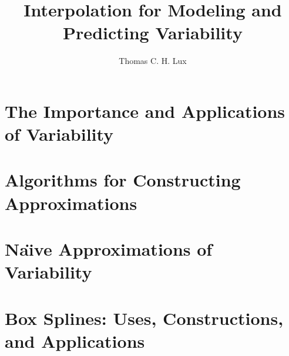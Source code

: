 \documentclass[doublespace,nopageskip]{VTthesis} %
\title{Interpolation for Modeling and Predicting Variability}
\author{Thomas C. H. Lux}
\begin{document}
\frontmatter
\maketitle
\tableofcontents

\listoffigures
\listoftables


\mainmatter


\chapter{The Importance and Applications of Variability} \label{ch:apps}


\chapter{Algorithms for Constructing Approximations} \label{ch:algs}


\chapter{Na\"{\i}ve Approximations of Variability} \label{ch:naive}


\chapter{Box Splines: Uses, Constructions, and Applications} \label{ch:boxes}

\end{document}
